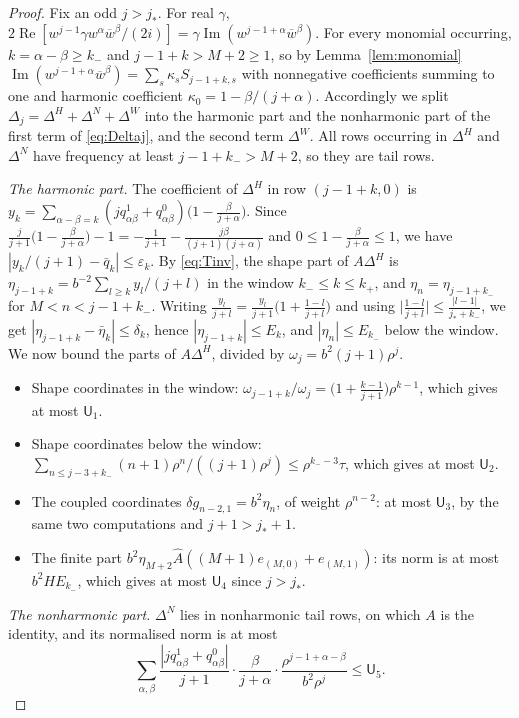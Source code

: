 \documentclass[11pt]{amsart}
\theoremstyle{definition}
\theoremstyle{remark}
\numberwithin{equation}{section}
\newcommand{\eps}{\varepsilon}
\newcommand{\bw}{\overline{w}}
\newcommand{\jst}{j_*}
\newcommand{\sU}{\mathsf{U}}
\DeclareMathOperator{\re}{Re}
\DeclareMathOperator{\im}{Im}
\begin{document}
\begin{proof}
Fix an odd $j>\jst$. For real $\gamma$, $2\re[w^{j-1}\gamma w^\alpha\bw^\beta/(2i)]=\gamma\im(w^{j-1+\alpha}\bw^\beta)$. For every monomial occurring, $k=\alpha-\beta\geq k_-$ and $j-1+k>M+2\geq1$, so by Lemma~\ref{lem:monomial} $\im(w^{j-1+\alpha}\bw^\beta)=\sum_s\kappa_sS_{j-1+k,s}$ with nonnegative coefficients summing to one and harmonic coefficient $\kappa_0=1-\beta/(j+\alpha)$. Accordingly we split $\Delta_j=\Delta^H+\Delta^N+\Delta^W$ into the harmonic part and the nonharmonic part of the first term of \eqref{eq:Deltaj}, and the second term $\Delta^W$. All rows occurring in $\Delta^H$ and $\Delta^N$ have frequency at least $j-1+k_->M+2$, so they are tail rows.

\emph{The harmonic part.} The coefficient of $\Delta^H$ in row $(j-1+k,0)$ is $y_k=\sum_{\alpha-\beta=k}(jq^1_{\alpha\beta}+q^0_{\alpha\beta})\big(1-\frac{\beta}{j+\alpha}\big)$. Since $\frac{j}{j+1}\big(1-\frac\beta{j+\alpha}\big)-1=-\frac1{j+1}-\frac{j\beta}{(j+1)(j+\alpha)}$ and $0\leq1-\frac\beta{j+\alpha}\leq1$, we have $|y_k/(j+1)-\bar q_k|\leq\eps_k$. By \eqref{eq:Tinv}, the shape part of $A\Delta^H$ is $\eta_{j-1+k}=b^{-2}\sum_{l\geq k}y_l/(j+l)$ in the window $k_-\leq k\leq k_+$, and $\eta_n=\eta_{j-1+k_-}$ for $M<n<j-1+k_-$. Writing $\frac{y_l}{j+l}=\frac{y_l}{j+1}\big(1+\frac{1-l}{j+l}\big)$ and using $\big|\frac{1-l}{j+l}\big|\leq\frac{|l-1|}{\jst+k_-}$, we get $|\eta_{j-1+k}-\bar\eta_k|\leq\delta_k$, hence $|\eta_{j-1+k}|\leq E_k$, and $|\eta_n|\leq E_{k_-}$ below the window. We now bound the parts of $A\Delta^H$, divided by $\omega_j=b^2(j+1)\rho^j$.
\begin{itemize}
\item Shape coordinates in the window: $\omega_{j-1+k}/\omega_j=\big(1+\frac{k-1}{j+1}\big)\rho^{k-1}$, which gives at most $\sU_1$.
\item Shape coordinates below the window: $\sum_{n\leq j-3+k_-}(n+1)\rho^n/((j+1)\rho^j)\leq\rho^{k_--3}\tau$, which gives at most $\sU_2$.
\item The coupled coordinates $\delta g_{n-2,1}=b^2\eta_n$, of weight $\rho^{n-2}$: at most $\sU_3$, by the same two computations and $j+1>\jst+1$.
\item The finite part $b^2\eta_{M+2}\widehat A((M+1)e_{(M,0)}+e_{(M,1)})$: its norm is at most $b^2HE_{k_-}$, which gives at most $\sU_4$ since $j>\jst$.
\end{itemize}

\emph{The nonharmonic part.} $\Delta^N$ lies in nonharmonic tail rows, on which $A$ is the identity, and its normalised norm is at most
\[
\sum_{\alpha,\beta}\frac{|jq^1_{\alpha\beta}+q^0_{\alpha\beta}|}{j+1}\cdot\frac{\beta}{j+\alpha}\cdot\frac{\rho^{j-1+\alpha-\beta}}{b^2\rho^j}\leq\sU_5 .
\]


\end{proof}
\end{document}
